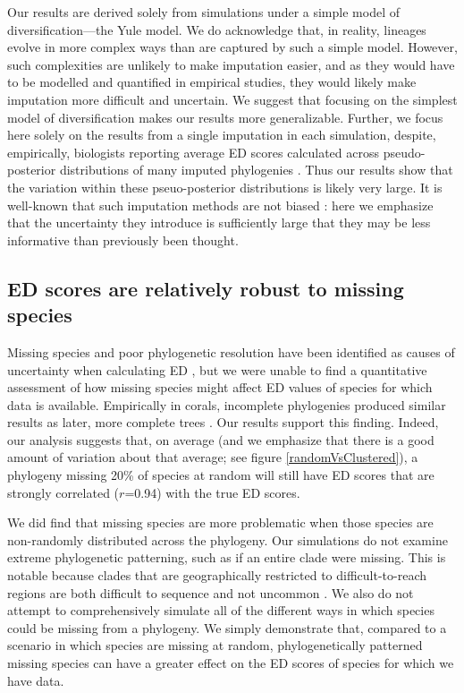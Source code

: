\documentclass[10pt,english]{article}
\begin{document}
Our results are derived solely from simulations under a simple model of
diversification---the Yule model. We do acknowledge that, in reality, lineages
evolve in more complex ways than are captured by such a simple model. However,
such complexities are unlikely to make imputation easier, and as they would have
to be modelled and quantified in empirical studies, they would likely make imputation more difficult and uncertain.
We suggest that focusing on the simplest model of diversification makes our
results more generalizable. Further, we focus here solely on the results from a
single imputation in each simulation, despite, empirically, biologists reporting
average ED scores calculated across pseudo-posterior distributions of many
imputed phylogenies \autocite{Kuhn2011}. Thus our results show that the
variation within these pseuo-posterior distributions is likely very large. It is
well-known that such imputation methods are not biased \autocite[indeed, this
was originally shown by][]{Kuhn2011}: here we emphasize that the uncertainty
they introduce is sufficiently large that they may be less informative than
previously been thought.

\subsection*{ED scores are relatively robust to missing species}
Missing species and poor phylogenetic resolution have been identified as causes
of uncertainty when calculating ED \autocite{Isaac2007}, but we were unable to
find a quantitative assessment of how missing species might affect ED values of
species for which data is available. Empirically in corals, incomplete phylogenies
produced similar results as later, more complete trees \autocite{Curnick2015}.
Our results support this finding. Indeed, our analysis suggests that, on average
(and we emphasize that there is a good amount of variation about that average;
see figure \ref{randomVsClustered}), a phylogeny missing 20\% of species at random will
still have ED scores that are strongly correlated ($r$=0.94) with the true ED
scores.

We did find that missing species are more problematic when those species are
non-randomly distributed across the phylogeny. Our simulations do not examine
extreme phylogenetic patterning, such as if an entire clade were missing. This
is notable because clades that are geographically restricted to
difficult-to-reach regions are both difficult to sequence and not uncommon
\autocite[as is seen with 27 coral species in the Indian
Ocean;][]{Arrigoni2012}. We also do
not attempt to comprehensively simulate all of the different ways in which
species could be missing from a phylogeny. We simply demonstrate that, compared
to a scenario in which species are missing at random,
phylogenetically patterned missing species can have a greater effect on the ED
scores of species for which we have data.
\end{document}
